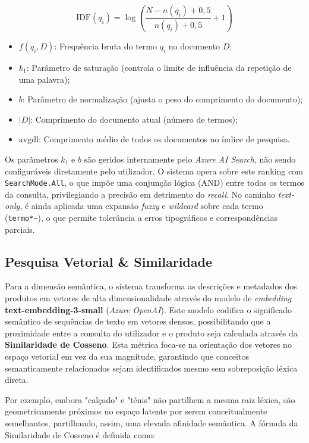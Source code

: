 \documentclass[runningheads]{llncs}
\begin{document}
$$\text{IDF}(q_i) = \log \left( \frac{N - n(q_i) + 0{,}5}{n(q_i) + 0{,}5} + 1 \right)$$

\begin{itemize}
\item $f(q_i, D)$: Frequência bruta do termo $q_i$ no documento $D$;
\item $k_1$: Parâmetro de saturação (controla o limite de influência da repetição de uma palavra);
\item $b$: Parâmetro de normalização (ajusta o peso do comprimento do documento);
\item $|D|$: Comprimento do documento atual (número de termos);
\item $\text{avgdl}$: Comprimento médio de todos os documentos no índice de pesquisa.
\end{itemize}

Os parâmetros $k_1$ e $b$ são geridos internamente pelo \textit{Azure AI Search}, não sendo configuráveis diretamente pelo utilizador. O sistema opera sobre este ranking com \texttt{SearchMode.All}, o que impõe uma conjunção lógica (AND) entre todos os termos da consulta, privilegiando a precisão em detrimento do \textit{recall}. No caminho \textit{text-only}, é ainda aplicada uma expansão \textit{fuzzy} e \textit{wildcard} sobre cada termo (\texttt{termo*\textasciitilde}), o que permite tolerância a erros tipográficos e correspondências parciais.

\subsection*{Pesquisa Vetorial \& Similaridade}
Para a dimensão semântica, o sistema transforma as descrições e metadados dos produtos em vetores de alta dimensionalidade através do modelo de \textit{embedding} \textbf{text-embedding-3-small} (\textit{Azure OpenAI}). Este modelo codifica o significado semântico de sequências de texto em vetores densos, possibilitando que a proximidade entre a consulta do utilizador e o produto seja calculada através da \textbf{Similaridade de Cosseno}. Esta métrica foca-se na orientação dos vetores no espaço vetorial em vez da sua magnitude, garantindo que conceitos semanticamente relacionados sejam identificados mesmo sem sobreposição léxica direta.

Por exemplo, embora "calçado" e "ténis" não partilhem a mesma raiz léxica, são geometricamente próximos no espaço latente por serem conceitualmente semelhantes, partilhando, assim, uma elevada afinidade semântica. A fórmula da Similaridade de Cosseno é definida como:
\end{document}
